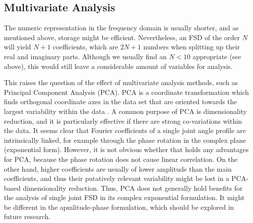 \subsection{Multivariate Analysis}
\label{sec:org947ac0f}
The numeric representation in the frequency domain is usually shorter, and as mentioned above, storage might be efficient.
Nevertheless, an FSD of the order \(N\) will yield \(N+1\) coefficients, which are \(2N+1\) numbers when splitting up their real and imaginary parts.
Although we usually find an \(N<10\) appropriate (see above), this would still leave a considerable amount of variables for analysis.

This raises the question of the effect of multivariate analysis methods, such as Principal Component Analysis (PCA).
PCA is a coordinate transformation which finds orthogonal coordinate axes in the data set that are oriented towards the largest variability within the data \citep{MacLeod2007}.
A common purpose of PCA is dimensionality reduction, and it is particularly effective if there are strong co-variations within the data.
It seems clear that Fourier coefficients of a single joint angle profile are intrinsically linked, for example through the phase rotation in the complex plane (exponential form).
However, it is not obvious whether that holds any advantages for PCA, because the phase rotation does not cause linear correlation.
On the other hand, higher coefficients are usually of lower amplitude than the main coefficients, and thus their putatively relevant variability might be lost in a PCA-based dimensionality reduction.
Thus, PCA does not generally hold benefits for the analysis of single joint FSD in its complex exponential formulation.
It might be different in the apmlitude-phase formulation, which should be explored in future research.


